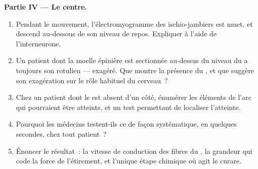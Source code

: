 \begin{problem}
\medskip
\noindent\textbf{Partie IV --- Le centre.}
\begin{enumerate}[resume]
  \item Pendant le mouvement, l'électromyogramme des ischio-jambiers
        est muet, et descend au-dessous de son niveau de repos.
        Expliquer à l'aide de l'interneurone.
  \item Un patient dont la moelle épinière est sectionnée au-dessus du
        niveau du  a toujours son  rotulien --- exagéré.
        Que montre la présence du , et que suggère son
        exagération sur le rôle habituel du cerveau~?
  \item Chez un patient dont le  est absent d'un côté, énumérer
        les éléments de l'arc qui pourraient être atteints, et un test
        permettant de localiser l'atteinte.
  \item Pourquoi les médecins testent-ils ce  de façon
        systématique, en quelques secondes, chez tout patient~?
  \item Énoncer le résultat~: la vitesse de conduction des fibres du
        , la grandeur qui code la force de l'étirement, et
        l'unique étape chimique où agit le curare.
\end{enumerate}
\end{problem}

